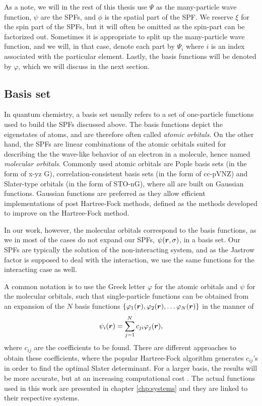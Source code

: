 As a note, we will in the rest of this thesis use $\Psi$ as the many-particle wave function, $\psi$ are the SPFs, and $\phi$ is the spatial part of the SPF. We reserve $\xi$ for the spin part of the SPFs, but it will often be omitted as the spin-part can be factorized out. Sometimes it is appropriate to split up the many-particle wave function, and we will, in that case, denote each part by $\Psi_i$ where $i$ is an index associated with the particular element. Lastly, the basis functions will be denoted by $\varphi$, which we will discuss in the next section.

\subsection{Basis set} \label{sec:basisset}
In quantum chemistry, a basis set usually refers to a set of one-particle functions used to build the SPFs discussed above. The basis functions depict the eigenstates of atoms, and are therefore often called \textit{atomic orbitals}. On the other hand, the SPFs are linear combinations of the atomic orbitals suited for describing the the wave-like behavior of an electron in a molecule, hence named \textit{molecular orbitals}. Commonly used atomic orbitals are Pople basis sets \cite{ditchfield_self-consistent_1971} (in the form of x-yz G), correlation-consistent basis sets \cite{dunning_gaussian_1989} (in the form of cc-pVNZ) and Slater-type orbitals \cite{slater_atomic_1930} (in the form of STO-nG), where all are built on Gaussian functions. Gaussian functions are preferred as they allow efficient implementations of post Hartree-Fock methods, defined as the methods developed to improve on the Hartree-Fock method.

In our work, however, the molecular orbitals correspond to the basis functions, as we in most of the cases do not expand our SPFs, $\psi(\boldsymbol{{r}},\sigma)$, in a basis set. Our SPFs are typically the solution of the non-interacting system, and as the Jastrow factor is supposed to deal with the interaction, we use the same functions for the interacting case as well.

A common notation is to use the Greek letter $\varphi$ for the atomic orbitals and $\psi$ for the molecular orbitals, such that single-particle functions can be obtained from an expansion of the $N$ basis functions $\{\varphi_1(\boldsymbol{{r}}),\varphi_2(\boldsymbol{{r}}),\hdots\varphi_N(\boldsymbol{{r}})\}$ in the manner of
\begin{equation}
\psi_i(\boldsymbol{{r}})=\sum_{j=1}^Nc_{ji}\varphi_j(\boldsymbol{{r}}),
\label{eq:expansion}
\end{equation}
where $c_{ij}$ are the coefficients to be found. There are different approaches to obtain these coefficients, where the popular Hartree-Fock algorithm generates $c_{ij}$'s in order to find the optimal Slater determinant. For a larger basis, the results will be more accurate, but at an increasing computational cost \cite{daniel_crawford_introduction_2007}. The actual functions used in this work are presented in chapter \ref{chp:systems} and they are linked to their respective systems. 

